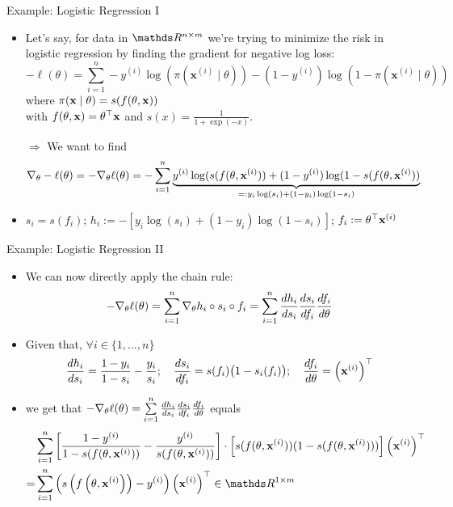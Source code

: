 \documentclass[11pt,compress,t,notes=noshow, xcolor=table]{beamer}
\newcommand{\deriv}{d}
\begin{document}
\begin{vbframe}{Example: Logistic Regression I}
\begin{itemize}    \setlength{\itemsep}{0.5\baselineskip}
    \item Let's say, for data in $\R^{n\times m}$ we're trying to minimize the risk in logistic regression by finding the gradient for negative log loss:
\[
-\ell({\theta})=\sum_{i=1}^n-y^{(i)} \log \left(\pi\left(\mathbf{x}^{(i)} \mid \theta\right)\right)-\left(1-y^{(i)}\right) \log \left(1-\pi\left(\mathbf{x}^{(i)} \mid \theta\right)\right)
\]
where $
\pi(\mathbf{x} \mid {\theta})=s(f(\theta,\mathbf{x}))
$\\[5pt] with 
$f(\theta,\mathbf{x})=\theta^{\top} \mathbf{x}$ and $s(x)=\frac{1}{1+\exp (-x)}$.
\item[$\Rightarrow$] We want to find \begin{align*}
\nabla_\theta -\ell (\theta)=-\nabla_\theta \ell (\theta)&=-\sum\limits_{i=1}^n\underbrace{ y^{(i)} \log (s(f(\theta,\mathbf{x}^{(i)}))+(1-y^{(i)}) \log (1-s(f(\theta,\mathbf{x}^{(i)}))}_{=:y_i \log (s_i)+(1-y_i) \log (1-s_i)}
\end{align*}
\item $s_i = s(f_i)$; $h_i:=-[y_i \log (s_i)+(1-y_i) \log (1-s_i)]$; $f_i:=\theta^{\top} \mathbf{x}^{(i)}$
\end{itemize}
\end{vbframe}

\begin{vbframe}{Example: Logistic Regression II}
\begin{itemize}    \setlength{\itemsep}{0.5\baselineskip}
\item We can now directly apply the chain rule:
$$
-\nabla_\theta \ell (\theta)=\sumin\nabla_\theta h_i\circ s_i \circ f_i=\sumin\frac{\deriv h_i}{\deriv s_i} \frac{\deriv s_i}{\deriv f_i} \frac{\deriv f_i}{\deriv \theta}
$$
    \item Given that, $\forall i\in\{1,\dots,n\}$ $$\frac{\deriv h_i}{\deriv s_i}=\frac{1-y_i}{1-s_i}-\frac{y_i}{s_i};\quad\frac{\deriv s_i}{\deriv f_i}=s(f_i)\big(1-s_i(f_i)\big);\quad\frac{\deriv f_i}{\deriv \theta}=\left(\xv^{(i)}\right)^\top$$
    \item we get that $-\nabla_\theta \ell (\theta)=\sumin\frac{\deriv h_i}{\deriv s_i} \frac{\deriv s_i}{\deriv f_i} \frac{\deriv f_i}{\deriv \theta}$  equals\begin{align*}
        &\sumin \left[\frac{1-y^{(i)}}{1-s(f(\theta, \xv^{(i)}))}-\frac{y^{(i)}}{s(f(\theta, \xv^{(i)}))}\right] \cdot \left[s(f(\theta, \xv^{(i)}))(1-s(f(\theta, \xv^{(i)})))\right] \left(\xv^{(i)}\right)^\top\\
        =&\sumin\left(s\left(f\left(\theta,\xv^{(i)}\right)\right)-y^{(i)}\right)\left(\xv^{(i)}\right)^\top\in\R^{1\times m}
    \end{align*}
\end{itemize}
\end{vbframe}
\end{document}
